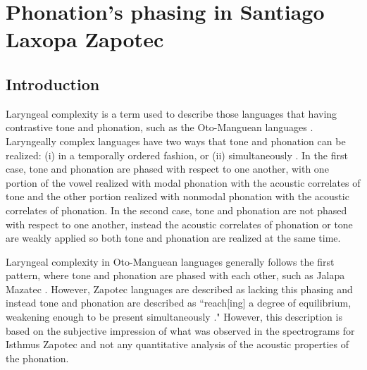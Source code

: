 \chapter{Phonation's phasing in Santiago Laxopa Zapotec} \label{ch:testing_lc}

\section{Introduction}\label{sec:introduction_of_lc}
Laryngeal complexity is a term used to describe those languages that having contrastive tone and phonation, such as the Oto-Manguean languages \citep{blankenshipTimeCourseBreathiness1997,blankenshipTimingNonmodalPhonation2002,silvermanLaryngealComplexityOtomanguean1997,silvermanPhasingRecoverability1997}. Laryngeally complex languages have two ways that tone and phonation can be realized: (i) in a temporally ordered fashion, or (ii) simultaneously \citep{silvermanLaryngealComplexityOtomanguean1997}. In the first case, tone and phonation are phased with respect to one another, with one portion of the vowel realized with modal phonation with the acoustic correlates of tone and the other portion realized with nonmodal phonation with the acoustic correlates of phonation. In the second case, tone and phonation are not phased with respect to one another, instead the acoustic correlates of phonation or tone are weakly applied so both tone and phonation are realized at the same time.

Laryngeal complexity in Oto-Manguean languages generally follows the first pattern, where tone and phonation are phased with each other, such as Jalapa Mazatec \citep{blankenshipTimeCourseBreathiness1997,blankenshipTimingNonmodalPhonation2002,silvermanLaryngealComplexityOtomanguean1997,silvermanPhasingRecoverability1997}. However, Zapotec languages are described as lacking this phasing and instead tone and phonation are described as ``reach[ing] a degree of equilibrium, weakening enough to be present simultaneously \citep[558]{herrerazendejasAmuzgoZapotecTwo2000}." However, this description is based on the subjective impression of what was observed in the spectrograms for Isthmus Zapotec and not any quantitative analysis of the acoustic properties of the phonation.  

